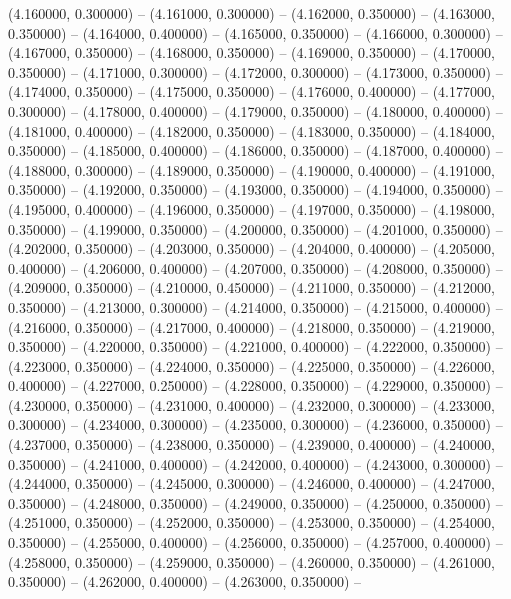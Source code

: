 (4.160000, 0.300000) -- 
(4.161000, 0.300000) -- 
(4.162000, 0.350000) -- 
(4.163000, 0.350000) -- 
(4.164000, 0.400000) -- 
(4.165000, 0.350000) -- 
(4.166000, 0.300000) -- 
(4.167000, 0.350000) -- 
(4.168000, 0.350000) -- 
(4.169000, 0.350000) -- 
(4.170000, 0.350000) -- 
(4.171000, 0.300000) -- 
(4.172000, 0.300000) -- 
(4.173000, 0.350000) -- 
(4.174000, 0.350000) -- 
(4.175000, 0.350000) -- 
(4.176000, 0.400000) -- 
(4.177000, 0.300000) -- 
(4.178000, 0.400000) -- 
(4.179000, 0.350000) -- 
(4.180000, 0.400000) -- 
(4.181000, 0.400000) -- 
(4.182000, 0.350000) -- 
(4.183000, 0.350000) -- 
(4.184000, 0.350000) -- 
(4.185000, 0.400000) -- 
(4.186000, 0.350000) -- 
(4.187000, 0.400000) -- 
(4.188000, 0.300000) -- 
(4.189000, 0.350000) -- 
(4.190000, 0.400000) -- 
(4.191000, 0.350000) -- 
(4.192000, 0.350000) -- 
(4.193000, 0.350000) -- 
(4.194000, 0.350000) -- 
(4.195000, 0.400000) -- 
(4.196000, 0.350000) -- 
(4.197000, 0.350000) -- 
(4.198000, 0.350000) -- 
(4.199000, 0.350000) -- 
(4.200000, 0.350000) -- 
(4.201000, 0.350000) -- 
(4.202000, 0.350000) -- 
(4.203000, 0.350000) -- 
(4.204000, 0.400000) -- 
(4.205000, 0.400000) -- 
(4.206000, 0.400000) -- 
(4.207000, 0.350000) -- 
(4.208000, 0.350000) -- 
(4.209000, 0.350000) -- 
(4.210000, 0.450000) -- 
(4.211000, 0.350000) -- 
(4.212000, 0.350000) -- 
(4.213000, 0.300000) -- 
(4.214000, 0.350000) -- 
(4.215000, 0.400000) -- 
(4.216000, 0.350000) -- 
(4.217000, 0.400000) -- 
(4.218000, 0.350000) -- 
(4.219000, 0.350000) -- 
(4.220000, 0.350000) -- 
(4.221000, 0.400000) -- 
(4.222000, 0.350000) -- 
(4.223000, 0.350000) -- 
(4.224000, 0.350000) -- 
(4.225000, 0.350000) -- 
(4.226000, 0.400000) -- 
(4.227000, 0.250000) -- 
(4.228000, 0.350000) -- 
(4.229000, 0.350000) -- 
(4.230000, 0.350000) -- 
(4.231000, 0.400000) -- 
(4.232000, 0.300000) -- 
(4.233000, 0.300000) -- 
(4.234000, 0.300000) -- 
(4.235000, 0.300000) -- 
(4.236000, 0.350000) -- 
(4.237000, 0.350000) -- 
(4.238000, 0.350000) -- 
(4.239000, 0.400000) -- 
(4.240000, 0.350000) -- 
(4.241000, 0.400000) -- 
(4.242000, 0.400000) -- 
(4.243000, 0.300000) -- 
(4.244000, 0.350000) -- 
(4.245000, 0.300000) -- 
(4.246000, 0.400000) -- 
(4.247000, 0.350000) -- 
(4.248000, 0.350000) -- 
(4.249000, 0.350000) -- 
(4.250000, 0.350000) -- 
(4.251000, 0.350000) -- 
(4.252000, 0.350000) -- 
(4.253000, 0.350000) -- 
(4.254000, 0.350000) -- 
(4.255000, 0.400000) -- 
(4.256000, 0.350000) -- 
(4.257000, 0.400000) -- 
(4.258000, 0.350000) -- 
(4.259000, 0.350000) -- 
(4.260000, 0.350000) -- 
(4.261000, 0.350000) -- 
(4.262000, 0.400000) -- 
(4.263000, 0.350000) -- 
